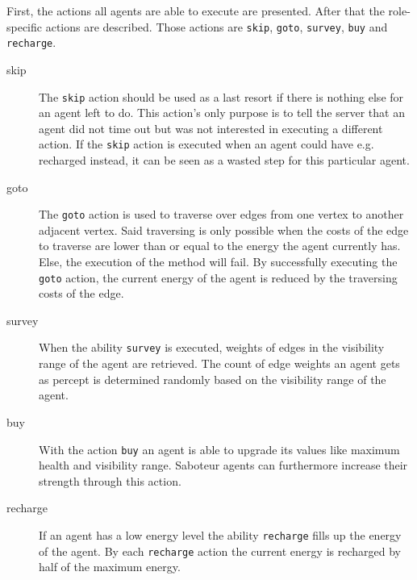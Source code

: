 First, the actions all agents are able to execute are presented.
After that the role-specific actions are described.
Those actions are \texttt{skip}, \texttt{goto}, \texttt{survey}, \texttt{buy} and \texttt{recharge}.
\begin{description}
   \item[skip] The \texttt{skip} action should be used as a last resort if there is nothing else for an agent left to do.
    This action's only purpose is to tell the server that an agent did not time out but was not interested in executing a different action.
    If the \texttt{skip} action is executed when an agent could have e.g. recharged instead, it can be seen as a wasted step for this particular agent.
   \item[goto] The \texttt{goto} action is used to traverse over edges from one vertex to another adjacent vertex.
    Said traversing is only possible when the costs of the edge to traverse are lower than or equal to the energy the agent currently has.
    Else, the execution of the method will fail.
    By successfully executing the \texttt{goto} action, the current energy of the agent is reduced by the traversing costs of the edge.
   \item[survey] When the ability \texttt{survey} is executed, weights of edges in the visibility range of the agent are retrieved.
    The count of edge weights an agent gets as percept is determined randomly based on the visibility range of the agent.
   \item[buy] With the action \texttt{buy} an agent is able to upgrade its values like maximum health and visibility range.
    Saboteur agents can furthermore increase their strength through this action.
   \item[recharge] If an agent has a low energy level the ability \texttt{recharge} fills up the energy of the agent.
    By each \texttt{recharge} action the current energy is recharged by half of the maximum energy.
\end{description}

